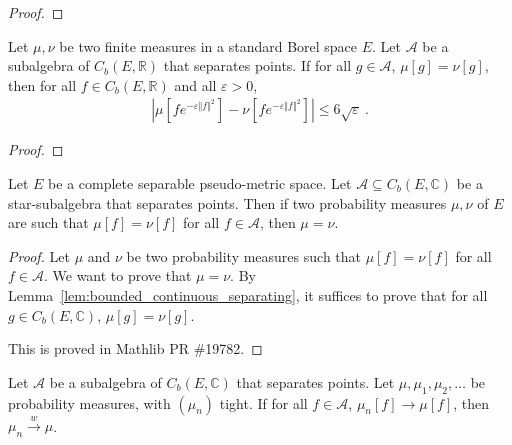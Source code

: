 \begin{proof}\leanok
\end{proof}


\begin{lemma}\label{lem:dist_integral_mulExpNegMulSq_comp_le}
\mathlibok
{}
Let $\mu, \nu$ be two finite measures in a standard Borel space $E$. Let $\mathcal{A}$ be a subalgebra of $C_b(E, \mathbb{R})$ that separates points.
If for all $g \in \mathcal A$, $\mu[g] = \nu[g]$, then for all $f \in C_b(E, \mathbb{R})$ and all $\varepsilon > 0$,
\begin{align*}
    \left\vert \mu[fe^{-\varepsilon \Vert f \Vert^2}] - \nu[f e^{-\varepsilon \Vert f \Vert^2}] \right\vert
    \le 6\sqrt{\varepsilon} \: .
\end{align*}
\end{lemma}

\begin{proof}\leanok
{}
\end{proof}


\begin{theorem}\label{thm:separating_starSubalgebra}
\mathlibok
{}
Let $E$ be a complete separable pseudo-metric space. Let $\mathcal A \subseteq C_b(E, \mathbb{C})$ be a star-subalgebra that separates points.
Then if two probability measures $\mu, \nu$ of $E$ are such that $\mu[f] = \nu[f]$ for all $f \in \mathcal A$, then $\mu = \nu$.
\end{theorem}

\begin{proof}
\leanok
Let $\mu$ and $\nu$ be two probability measures such that $\mu[f] = \nu[f]$ for all $f \in \mathcal A$. We want to prove that $\mu = \nu$.
By Lemma~\ref{lem:bounded_continuous_separating}, it suffices to prove that for all $g \in C_b(E, \mathbb{C})$, $\mu[g] = \nu[g]$.

This is proved in Mathlib PR \#19782.
\end{proof}


\begin{lemma}\label{lem:cvg_of_separating}
\leanok
{}
Let $\mathcal A$ be a subalgebra of $C_b(E, \mathbb{C})$ that separates points. Let $\mu, \mu_1, \mu_2, \ldots$ be probability measures, with $(\mu_n)$ tight. If for all $f \in \mathcal A$, $\mu_n[f] \to \mu[f]$, then $\mu_n \xrightarrow{w} \mu$.
\end{lemma}

